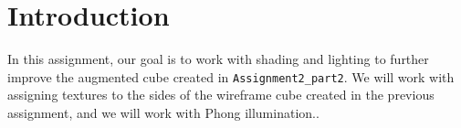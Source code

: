 \section{Introduction}
In this assignment, our goal is to work with shading and lighting to further improve the augmented cube created in \verb|Assignment2_part2|. We will work with assigning textures to the sides of the wireframe cube created in the previous assignment, and we will work with Phong illumination..